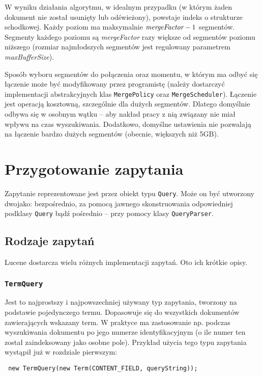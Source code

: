 W wyniku działania algorytmu, w idealnym przypadku (w którym żaden dokument nie został usunięty lub odświeżony), powstaje indeks o strukturze schodkowej. Każdy poziom ma maksymalnie $\emph{mergeFactor} - 1$ segmentów. Segmenty każdego poziomu są \emph{mergeFactor} razy większe od segmentów poziomu niższego (rozmiar najmłodszych segmentów jest regulowany parametrem \emph{maxBufferSize}).

Sposób wyboru segmentów do połączenia oraz momentu, w którym ma odbyć się łączenie może być modyfikowany przez programistę (należy dostarczyć implementacji abstrakcyjnych klas \texttt{MergePolicy} oraz \texttt{MergeScheduler}). Łączenie jest operacją kosztowną, szczególnie dla dużych segmentów. Dlatego domyślnie odbywa się w osobnym wątku -- aby nakład pracy z nią związany nie miał wpływu na czas wyszukiwania. Dodatkowo, domyślne ustawienia nie pozwalają na łączenie bardzo dużych segmentów (obecnie, większych niż 5GB).

\section{Przygotowanie zapytania}

Zapytanie reprezentowane jest przez obiekt typu \texttt{Query}. Może on być utworzony dwojako: bezpośrednio, za pomocą jawnego skonstruowania odpowiedniej podklasy \texttt{Query} bądź pośrednio -- przy pomocy klasy \texttt{QueryParser}.

\subsection{Rodzaje zapytań}

Lucene dostarcza wielu różnych implementacji zapytań. Oto ich krótkie opisy.

\subsubsection{\texttt{TermQuery}}

Jest to najprostszy i najpowszechniej używany typ zapytania, tworzony na podstawie pojedynczego termu. Dopasowuje się do wszystkich dokumentów zawierających wskazany term. W praktyce ma zastosowanie np. podczas wyszukiwania dokumentu po jego numerze identyfikacyjnym (o ile numer ten został zaindeksowany jako osobne pole). Przykład użycia tego typu zapytania wystąpił już w rozdziale pierwszym:

\begin{lstlisting}
 new TermQuery(new Term(CONTENT_FIELD, queryString));
\end{lstlisting}

